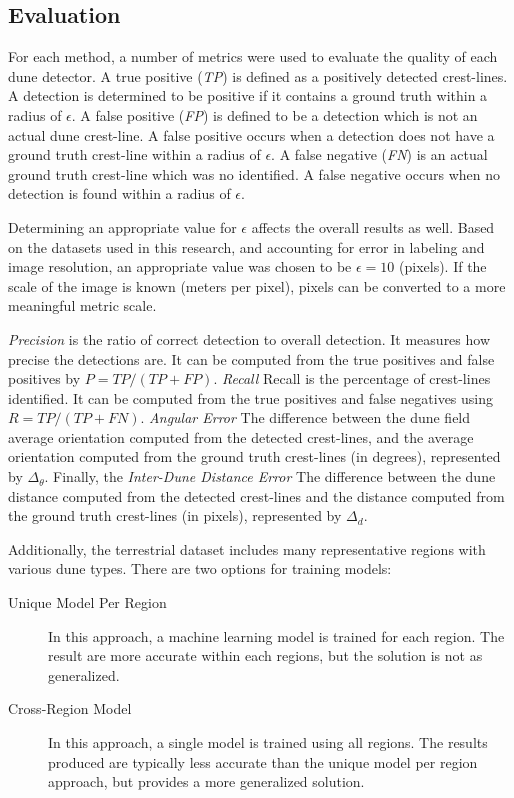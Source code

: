 \subsection{Evaluation}\label{subsec:evaluation}

For each method, a number of metrics were used to evaluate the quality of each dune detector. A true positive (\emph{TP}) is defined as a positively detected crest-lines. A detection is determined to be positive if it contains a ground truth within a radius of $\epsilon$. A false positive (\emph{FP}) is defined to be a detection which is not an actual dune crest-line. A false positive occurs when a detection does not have a ground truth crest-line within a radius of $\epsilon$. A false negative (\emph{FN}) is an actual ground truth crest-line which was no identified. A false negative occurs when no detection is found within a radius of $\epsilon$.

Determining an appropriate value for $\epsilon$ affects the overall results as well. Based on the datasets used in this research, and accounting for error in labeling and image resolution, an appropriate value was chosen to be $\epsilon=10$ (pixels). If the scale of the image is known (meters per pixel), pixels can be converted to a more meaningful metric scale.

\emph{Precision} is the ratio of correct detection to overall detection. It measures how precise the detections are. It can be computed from the true positives and false positives by $P=TP/(TP+FP)$. \emph{Recall} Recall is the percentage of crest-lines identified. It can be computed from the true positives and false negatives using $R=TP/(TP+FN)$. \emph{Angular Error} The difference between the dune field average orientation computed from the detected crest-lines, and the average orientation computed from the ground truth crest-lines (in degrees), represented by $\Delta_{\theta}$. Finally, the \emph{Inter-Dune Distance Error} The difference between the dune distance computed from the detected crest-lines and the distance computed from the ground truth crest-lines (in pixels), represented by $\Delta_{d}$.

Additionally, the terrestrial dataset includes many representative regions with various dune types. There are two options for training models:
\begin{description}
	\item[Unique Model Per Region] In this approach, a machine learning model is trained for each region. The result are more accurate within each regions, but the solution is not as generalized. 
	\item[Cross-Region Model] In this approach, a single model is trained using all regions. The results produced are typically less accurate than the unique model per region approach, but provides a more generalized solution.
\end{description}

